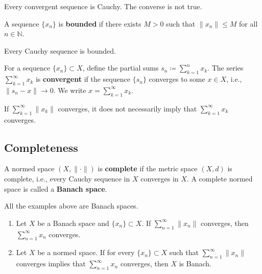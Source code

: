 \begin{remark}
Every convergent sequence is Cauchy. The converse is not true.
\end{remark}

\begin{definition}
A sequence \( \{x_n\} \) is \textbf{bounded} if there exists \( M > 0 \) such that \( \|x_n\| \leq M \) for all \( n \in \mathbb{N} \).
\end{definition}

\begin{remark}
Every Cauchy sequence is bounded.
\end{remark}

\begin{definition}
For a sequence \( \{x_n\} \subset X \), define the partial sums \( s_n \coloneqq \sum_{k=1}^{n} x_k \). The series \( \sum_{k=1}^{\infty} x_k \) is \textbf{convergent} if the sequence \( \{s_n\} \) converges to some \( x \in X \), i.e., \( \|s_n - x\| \to 0 \). We write \( x = \sum_{k=1}^{\infty} x_k \).
\end{definition}

\begin{remark}
If \( \sum_{k=1}^{\infty} \|x_k\| \) converges, it does not necessarily imply that \( \sum_{k=1}^{\infty} x_k \) converges.
\end{remark}

\subsection{Completeness}

\begin{definition}
A normed space \( (X, \|\cdot\|) \) is \textbf{complete} if the metric space \( (X, d) \) is complete, i.e., every Cauchy sequence in \( X \) converges in \( X \). A complete normed space is called a \textbf{Banach space}.
\end{definition}

\begin{example}
All the examples above are Banach spaces.
\end{example}

\begin{theorem}
\begin{enumerate}
    \item Let \( X \) be a Banach space and \( \{x_n\} \subset X \). If \( \sum_{n=1}^{\infty} \|x_n\| \) converges, then \( \sum_{n=1}^{\infty} x_n \) converges.
    \item Let \( X \) be a normed space. If for every \( \{x_n\} \subset X \) such that \( \sum_{n=1}^{\infty} \|x_n\| \) converges implies that \( \sum_{n=1}^{\infty} x_n \) converges, then \( X \) is Banach.
\end{enumerate}
\end{theorem}

